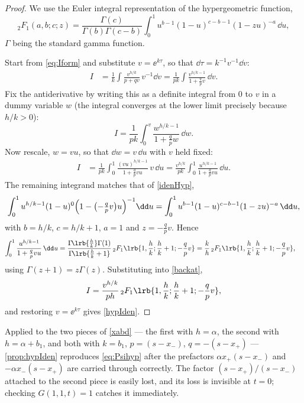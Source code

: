 \begin{proof}
We use the Euler integral representation of the hypergeometric function,
\begin{equation}
\label{idenHyp}
{}_2F_1(a,b;c;z) = \frac{\Gamma(c)}{\Gamma(b)\Gamma(c-b)}\int^1_0 u^{b-1}(1-u)^{c-b-1}(1-zu)^{-a}\,\dd u ,
\end{equation}
$\Gamma$ being the standard gamma function.

Start from \cref{eq:Iform} and substitute $v = \ee^{k\tau}$, so that
$\dd\tau = k^{-1}v^{-1}\dd v$:
\begin{align*}
I &= \frac{1}{k}\int\frac{v^{h/k}}{p+qv}\,v^{-1}\dd v
= \frac{1}{pk}\int\frac{v^{h/k-1}}{1+\frac{q}{p}v}\,\dd v .
\end{align*}
Fix the antiderivative by writing this as a definite integral from $0$ to $v$ in a dummy
variable $w$ (the integral converges at the lower limit precisely because $h/k>0$):
\begin{equation*}
I = \frac{1}{pk}\int^v_0\frac{w^{h/k-1}}{1+\frac{q}{p}w}\,\dd w .
\end{equation*}
Now rescale, $w = vu$, so that $\dd w = v\,\dd u$ with $v$ held fixed:
\begin{align}
I &= \frac{1}{pk}\int^1_0\frac{(vu)^{h/k-1}}{1+\frac{q}{p}vu}\,v\,\dd u
= \frac{v^{h/k}}{pk}\int^1_0\frac{u^{h/k-1}}{1+\frac{q}{p}vu}\,\dd u . \label{backat}
\end{align}
The remaining integrand matches that of \cref{idenHyp},
\begin{equation*}
\int^1_0 u^{h/k-1}(1-u)^{0}\Bigl(1-\bigl(-\tfrac{q}{p}v\bigr)u\Bigr)^{-1}\dd u
= \int^1_0 u^{b-1}(1-u)^{c-b-1}(1-zu)^{-a}\,\dd u ,
\end{equation*}
with $b = h/k$, $c = h/k+1$, $a = 1$ and $z = -\tfrac{q}{p}v$. Hence
\begin{align*}
\int^1_0\frac{u^{h/k-1}}{1+\frac{q}{p}vu}\,\dd u
&= \frac{\Gamma\!\lrb{\frac{h}{k}}\Gamma(1)}{\Gamma\!\lrb{\frac{h}{k}+1}}\,{}_2F_1\lrb{1,\frac{h}{k};\frac{h}{k}+1;-\frac{q}{p}v}
= \frac{k}{h}\,{}_2F_1\lrb{1,\frac{h}{k};\frac{h}{k}+1;-\frac{q}{p}v},
\end{align*}
using $\Gamma(z+1) = z\Gamma(z)$. Substituting into \cref{backat},
\begin{equation*}
I = \frac{v^{h/k}}{ph}\,{}_2F_1\lrb{1,\frac{h}{k};\frac{h}{k}+1;-\frac{q}{p}v},
\end{equation*}
and restoring $v = \ee^{k\tau}$ gives \cref{hypIden}.
\end{proof}

\begin{remark}
Applied to the two pieces of \cref{xabd} --- the first with $h=\alpha$, the second with
$h = \alpha+b_1$, and both with $k=b_1$, $p=(s-x_-)$, $q=-(s-x_+)$ ---
\cref{prop:hypIden} reproduces \cref{eq:Psihyp} after the prefactors
$\alpha x_+(s-x_-)$ and $-\alpha x_-(s-x_+)$ are carried through correctly. The factor
$(s-x_+)/(s-x_-)$ attached to the second piece is easily lost, and its loss is invisible
at $t=0$; checking $G(1,1,t)=1$ catches it immediately.
\end{remark}

